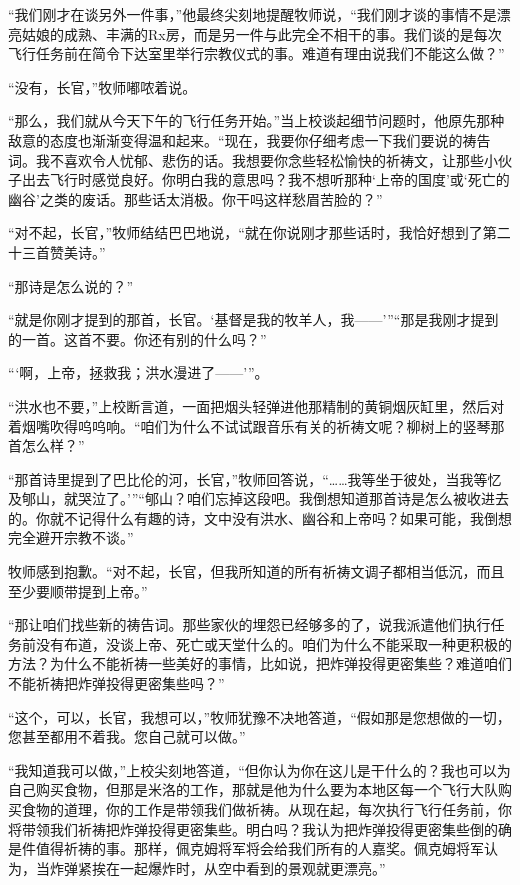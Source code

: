     “我们刚才在谈另外一件事，”他最终尖刻地提醒牧师说，“我们刚才谈的事情不是漂亮姑娘的成熟、丰满的Rx房，而是另一件与此完全不相干的事。我们谈的是每次飞行任务前在简令下达室里举行宗教仪式的事。难道有理由说我们不能这么做？”

    “没有，长官，”牧师嘟哝着说。

    “那么，我们就从今天下午的飞行任务开始。”当上校谈起细节问题时，他原先那种敌意的态度也渐渐变得温和起来。“现在，我要你仔细考虑一下我们要说的祷告词。我不喜欢令人忧郁、悲伤的话。我想要你念些轻松愉快的祈祷文，让那些小伙子出去飞行时感觉良好。你明白我的意思吗？我不想听那种‘上帝的国度’或‘死亡的幽谷’之类的废话。那些话太消极。你干吗这样愁眉苦脸的？”

    “对不起，长官，”牧师结结巴巴地说，“就在你说刚才那些话时，我恰好想到了第二十三首赞美诗。”

    “那诗是怎么说的？”

    “就是你刚才提到的那首，长官。‘基督是我的牧羊人，我——’”“那是我刚才提到的一首。这首不要。你还有别的什么吗？”

    “‘啊，上帝，拯救我；洪水漫进了——’”。

    “洪水也不要，”上校断言道，一面把烟头轻弹进他那精制的黄铜烟灰缸里，然后对着烟嘴吹得呜呜响。“咱们为什么不试试跟音乐有关的祈祷文呢？柳树上的竖琴那首怎么样？”

    “那首诗里提到了巴比伦的河，长官，”牧师回答说，“……我等坐于彼处，当我等忆及郇山，就哭泣了。’”“郇山？咱们忘掉这段吧。我倒想知道那首诗是怎么被收进去的。你就不记得什么有趣的诗，文中没有洪水、幽谷和上帝吗？如果可能，我倒想完全避开宗教不谈。”

    牧师感到抱歉。“对不起，长官，但我所知道的所有祈祷文调子都相当低沉，而且至少要顺带提到上帝。”

    “那让咱们找些新的祷告词。那些家伙的埋怨已经够多的了，说我派遣他们执行任务前没有布道，没谈上帝、死亡或天堂什么的。咱们为什么不能采取一种更积极的方法？为什么不能祈祷一些美好的事情，比如说，把炸弹投得更密集些？难道咱们不能祈祷把炸弹投得更密集些吗？”

    “这个，可以，长官，我想可以，”牧师犹豫不决地答道，“假如那是您想做的一切，您甚至都用不着我。您自己就可以做。”
 


    “我知道我可以做，”上校尖刻地答道，“但你认为你在这儿是干什么的？我也可以为自己购买食物，但那是米洛的工作，那就是他为什么要为本地区每一个飞行大队购买食物的道理，你的工作是带领我们做祈祷。从现在起，每次执行飞行任务前，你将带领我们祈祷把炸弹投得更密集些。明白吗？我认为把炸弹投得更密集些倒的确是件值得祈祷的事。那样，佩克姆将军将会给我们所有的人嘉奖。佩克姆将军认为，当炸弹紧挨在一起爆炸时，从空中看到的景观就更漂亮。”

